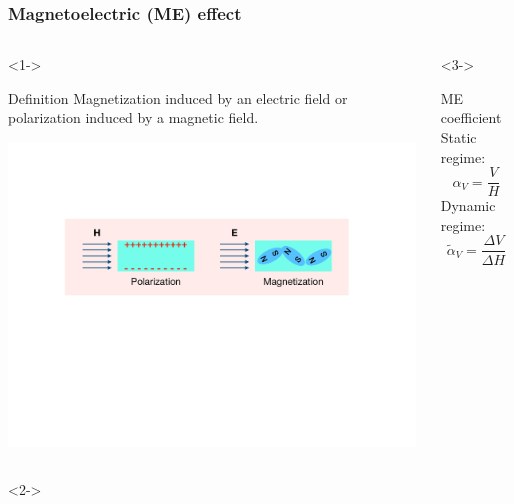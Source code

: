 \documentclass[compress]{beamer}
\begin{document}
\begin{frame}\frametitle{Magnetoelectric (ME) effect}
\vspace{-10.5pt}
\begin{columns}[totalwidth=\textwidth] 
   \begin{column}{.73\textwidth}<1->
   \begin{block}{Definition}
	Magnetization induced by an electric field or polarization induced by a magnetic field.
	\end{block} 
   \includegraphics[width=0.99\textwidth]{Graphic/01_illusmeeffect.pdf}
   \end{column}
   \begin{column}{.25\textwidth}<3->
       \begin{exampleblock}{ME coefficient} 
       Static regime:
          \begin{equation*}
          \alpha_V = \frac{V}{H}
          \end{equation*}
       Dynamic regime:
          \begin{equation*}
          \tilde{\alpha}_V = \frac{\Delta V}{\Delta H}
          \end{equation*}
       \end{exampleblock}
   \end{column}
\end{columns}
\begin{columns}[totalwidth=\textwidth]<2-> 
   \begin{column}{.65\textwidth}

\end{column}
\end{columns}
\end{frame}
\end{document}
